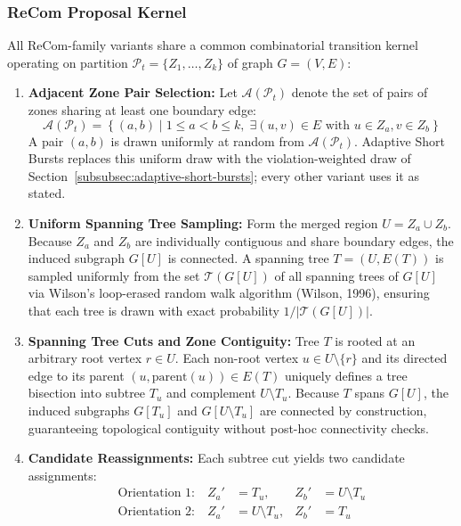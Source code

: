 \documentclass{article}
\begin{document}
\subsubsection{ReCom Proposal Kernel}
All ReCom-family variants share a common combinatorial transition kernel operating on partition $\mathcal{P}_t = \{Z_1, \dots, Z_k\}$ of graph $G = (V, E)$: 
\begin{enumerate}
    \item \textbf{Adjacent Zone Pair Selection:} Let $\mathcal{A}(\mathcal{P}_t)$ denote the set of pairs of zones sharing at least one boundary edge:
    \begin{equation}
    \mathcal{A}(\mathcal{P}_t) = \left\{(a, b) \mid 1 \le a < b \le k, \; \exists (u, v) \in E \text{ with } u \in Z_a, v \in Z_b\right\}
    \end{equation}
    A pair $(a, b)$ is drawn uniformly at random from $\mathcal{A}(\mathcal{P}_t)$. Adaptive Short Bursts replaces this uniform draw with the violation-weighted draw of Section~\ref{subsubsec:adaptive-short-bursts}; every other variant uses it as stated.
    \item \textbf{Uniform Spanning Tree Sampling:} Form the merged region $U = Z_a \cup Z_b$. Because $Z_a$ and $Z_b$ are individually contiguous and share boundary edges, the induced subgraph $G[U]$ is connected. A spanning tree $T = (U, E(T))$ is sampled uniformly from the set $\mathcal{T}(G[U])$ of all spanning trees of $G[U]$ via Wilson's loop-erased random walk algorithm (Wilson, 1996), ensuring that each tree is drawn with exact probability $1 / |\mathcal{T}(G[U])|$.
    \item \textbf{Spanning Tree Cuts and Zone Contiguity:} Tree $T$ is rooted at an arbitrary root vertex $r \in U$. Each non-root vertex $u \in U \setminus \{r\}$ and its directed edge to its parent $(u, \text{parent}(u)) \in E(T)$ uniquely defines a tree bisection into subtree $T_u$ and complement $U \setminus T_u$. Because $T$ spans $G[U]$, the induced subgraphs $G[T_u]$ and $G[U \setminus T_u]$ are connected by construction, guaranteeing topological contiguity without post-hoc connectivity checks.
    \item \textbf{Candidate Reassignments:} Each subtree cut yields two candidate assignments:
    \begin{align}
    \text{Orientation 1:} \quad Z_a' &= T_u, & Z_b' &= U \setminus T_u \\
    \text{Orientation 2:} \quad Z_a' &= U \setminus T_u, & Z_b' &= T_u
    \end{align}

\end{enumerate}
\end{document}
